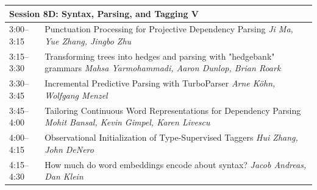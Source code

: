 \documentclass{book}
\renewcommand{\large}{\fontsize{36}{40}\selectfont}
\begin{document}
\begin{tabular}{p{3in}p{16in}}
  \multicolumn{2}{l}{\bfseries\large Session 8D: Syntax, Parsing, and Tagging V} \\\hline

    
    3:00--3:15
    &	Punctuation Processing for Projective Dependency Parsing \newline 
    {\itshape Ji Ma, Yue Zhang, Jingbo Zhu} \\
    
    3:15--3:30
    &	Transforming trees into hedges and parsing with "hedgebank" grammars \newline 
    {\itshape Mahsa Yarmohammadi, Aaron Dunlop, Brian Roark} \\
    
    3:30--3:45
    &	Incremental Predictive Parsing with TurboParser \newline 
    {\itshape Arne Köhn, Wolfgang Menzel} \\
    
    3:45--4:00
    &	Tailoring Continuous Word Representations for Dependency Parsing \newline 
    {\itshape Mohit Bansal, Kevin Gimpel, Karen Livescu} \\
    
    4:00--4:15
    &	Observational Initialization of Type-Supervised Taggers \newline 
    {\itshape Hui Zhang, John DeNero} \\
    
    4:15--4:30
    &	How much do word embeddings encode about syntax? \newline 
    {\itshape Jacob Andreas, Dan Klein} \\
    
\end{tabular}
\end{document}
